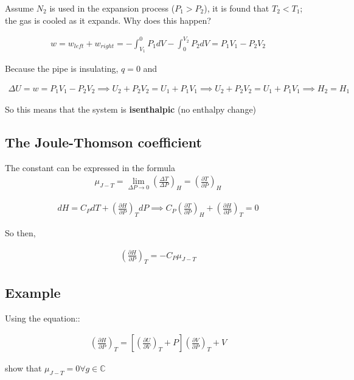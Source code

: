 \documentclass[12pt]{book}
\begin{document}
Assume $N_2$ is used in the expansion process ($P_1>P_2$), it is found that $T_2<T_1$; the gas is cooled as it expands. Why does this happen?

\begin{align*}
    w=w_{left}+w_{right}=-\int_{V_1}^{0}P_1dV-\int_{0}^{V_2}P_2dV=P_1V_1-P_2V_2
\end{align*}

Because the pipe is insulating, $q=0$ and

\begin{align*}
    \Delta U=w=P_1V_1-P_2V_2\implies U_2+P_2V_2=U_1+P_1V_1\implies U_2+P_2V_2=U_1+P_1V_1\implies H_2=H_1
\end{align*}

So this means that the system is \textbf{isenthalpic} (no enthalpy change)

\subsection*{The Joule-Thomson coefficient}
The constant can be expressed in the formula
\begin{align*}
    \mu_{J-T}=\lim_{\Delta P\rightarrow 0} \left(\frac{\Delta T}{\Delta P}\right)_H=\left(\frac{\partial T}{\partial P}\right)_H
\end{align*}

\begin{align*}
    dH=C_P dT+\left(\frac{\partial H}{\partial P}\right)_T dP\implies C_P\left(\frac{\partial T}{\partial P}\right)_H+\left(\frac{\partial H}{\partial P}\right)_T=0
\end{align*}

So then,

\begin{align*}
    \left(\frac{\partial H}{\partial P}\right)_T=-C_P\mu_{J-T}
\end{align*}

\subsection*{Example}

Using the equation::

\begin{align*}
    \left(\frac{\partial H}{\partial P}\right)_T=\left[\left(\frac{\partial U}{\partial V}\right)_T+P\right]\left(\frac{\partial V}{\partial P}\right)_T+V
\end{align*}

show that $\mu_{J-T}=0\forall g\in \mathbb{C}$
\end{document}
